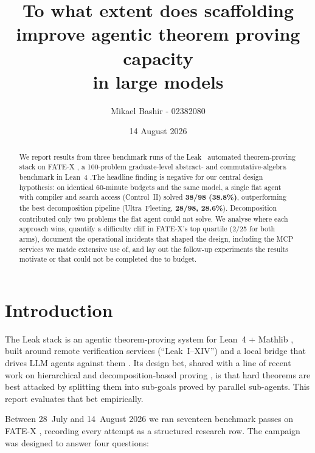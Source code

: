 \documentclass[12pt, a4paper]{article}
\title{\textbf{To what extent does scaffolding improve agentic theorem
proving capacity\\ in large models}}
\author{Mikael Bashir - 02382080}
\date{14 August 2026}
\begin{document}
\maketitle

\begin{abstract}
\noindent
We report results from three benchmark runs of the Leak~\cite{leakabout} automated
theorem-proving stack on FATE-X \cite{fatex2025}, a 100-problem graduate-level
abstract- and commutative-algebra benchmark in Lean~4 \cite{demoura2021lean4}.The headline 
finding is negative for our central design hypothesis: on identical 60-minute budgets and the same model, a single
flat agent with compiler and search access (Control~II) solved
\textbf{38/98 (38.8\%)}, outperforming the best decomposition pipeline
(Ultra~Fleeting, \textbf{28/98, 28.6\%}). Decomposition contributed only two problems
the flat agent could not solve. We analyse where each approach wins, quantify a
difficulty cliff in FATE-X's top quartile (2/25 for both arms), document the
operational incidents that shaped the design, including the MCP services we matde 
extensive use of, and lay out the follow-up experiments the results motivate or 
that could not be completed due to budget.
\end{abstract}

\tableofcontents
\newpage

\section{Introduction}

The Leak stack is an agentic theorem-proving system for Lean~4 + Mathlib
\cite{demoura2021lean4,mathlib2020}, built around remote verification services
(``Leak~I--XIV'') and a local bridge that drives LLM agents against them
\cite{competemath,hfspaces}. Its design bet, shared with a line of recent work
on hierarchical and decomposition-based proving
\cite{lample2022hypertree,deepseekproverv2,decomposition_openreview,davis2025goedelspoetry},
is that hard theorems are best attacked by splitting them into sub-goals proved
by parallel sub-agents. This report evaluates that bet empirically.

Between 28~July and 14~August 2026 we ran seventeen benchmark passes on FATE-X
\cite{fatex2025,benchmarklist_fatex}, recording every attempt as a structured
research row. The campaign was designed to answer four questions:
\end{document}
